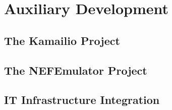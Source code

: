 
\chapter{Auxiliary Development}
\section{The Kamailio Project}
\section{The NEFEmulator Project}
\section{IT Infrastructure Integration}

